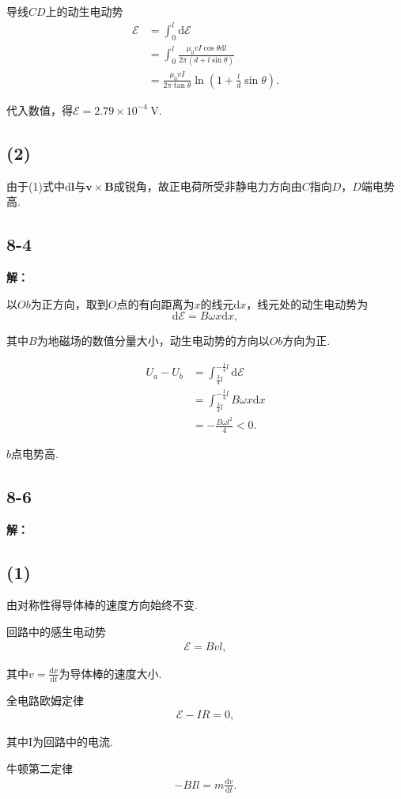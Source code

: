 \documentclass[twocolumn]{ctexart}
\newcommand{\sol}[1]{\subsection*{#1}\noindent\textbf{解：}
	
}
\begin{document}
	导线$CD$上的动生电动势
	\begin{align*}
		\mathscr{E}&=\int_{0}^{l}\mathrm{d}\mathscr{E}\\
		&=\int_{0}^{l}\frac{\mu_0vI\cos\theta\mathrm{d}l}{2\pi\left(d+l\sin\theta\right)}\\
		&=\frac{\mu_0vI}{2\pi\tan\theta}\ln\left(1+\frac{l}{d}\sin\theta\right).
	\end{align*}

	代入数值，得$\mathscr{E}=2.79\times10^{-4}\ \mathrm V$.
	
	\subsection*{(2)}
	由于(1)式中$\mathrm{d}\mathbf{l}$与$\mathbf{v}\times\mathbf{B}$成锐角，故正电荷所受非静电力方向由$C$指向$D$，$D$端电势高.
	
	\sol{8-4}
	以$Ob$为正方向，取到$O$点的有向距离为$x$的线元$\mathrm dx$，线元处的动生电动势为
	$$\mathrm d\mathscr E=B\omega x\mathrm dx,$$
	
	其中$B$为地磁场的数值分量大小，动生电动势的方向以$Ob$方向为正.
	
	\begin{align*}
		U_a-U_b&=\int_{\frac{3}{4}l}^{-\frac{1}{4}l}\mathrm d\mathscr E\\
		&=\int_{\frac{3}{4}l}^{-\frac{1}{4}l}B\omega x\mathrm dx\\
		&=-\frac{B\omega l^2}{4}<0.
	\end{align*}
	
	$b$点电势高.
	
	\sol{8-6}
	\subsection*{(1)}
	\setcounter{equation}{0}
	由对称性得导体棒的速度方向始终不变.
	
	回路中的感生电动势
	\begin{align}
		\mathscr E=Bvl,
	\end{align}

	其中$v=\frac{\mathrm dx}{\mathrm dt}$为导体棒的速度大小.
	
	全电路欧姆定律
	\begin{align}
		\mathscr E-IR=0,
	\end{align}
	
	其中I为回路中的电流.
	
	牛顿第二定律
	\begin{align}
		-BIl=m\frac{\mathrm dv}{\mathrm dt}.
	\end{align}
\end{document}
